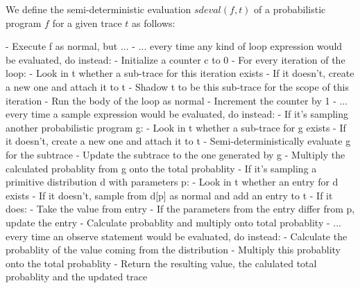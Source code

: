 We define the semi-deterministic evaluation $sdeval(f,t)$ of a probabilistic program $f$ for a given trace $t$ as follows:

- Execute f as normal, but ...
  - ... every time any kind of loop expression would be evaluated, do instead:
    - Initialize a counter c to 0
    - For every iteration of the loop:
      - Look in t whether a sub-trace for this iteration exists
      - If it doesn't, create a new one and attach it to t
      - Shadow t to be this sub-trace for the scope of this iteration
      - Run the body of the loop as normal
      - Increment the counter by 1
  - ... every time a sample expression would be evaluated, do instead:
    - If it's sampling another probabilistic program g:
      - Look in t whether a sub-trace for g exists
      - If it doesn't, create a new one and attach it to t
      - Semi-deterministically evaluate g for the subtrace
      - Update the subtrace to the one generated by g
      - Multiply the calculated probablity from g onto the total probablity
    - If it's sampling a primitive distribution d with parameters p:
      - Look in t whether an entry for d exists
      - If it doesn't, sample from d[p] as normal and add an entry to t
      - If it does:
        - Take the value from entry
        - If the parameters from the entry differ from p, update the entry
      - Calculate probablity and multiply onto total probablity
  - ... every time an observe statement would be evaluated, do instead:
    - Calculate the probablity of the value coming from the distribution
    - Multiply this probablity onto the total probablity
- Return the resulting value, the calulated total probablity and the updated trace